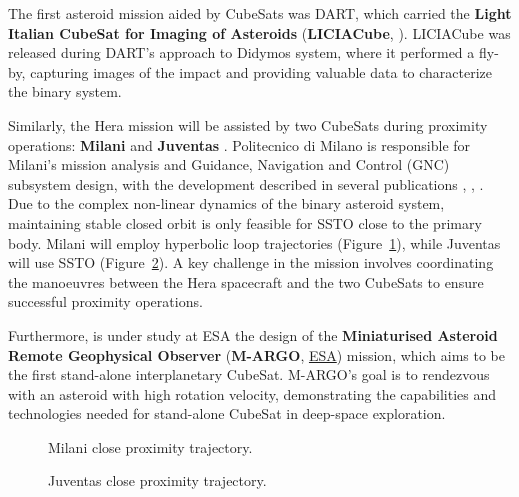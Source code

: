 \documentclass{Configuration_gigi/PoliMi3i_thesis}
\begin{document}
The first asteroid mission aided by CubeSats was DART, which carried the \textbf{Light Italian CubeSat for Imaging of Asteroids} (\textbf{LICIACube}, \cite{liciacube}). LICIACube was released during DART's approach to Didymos system, where it performed a fly-by, capturing images of the impact and providing valuable data to characterize the binary system. 

Similarly, the Hera mission will be assisted by two CubeSats during proximity operations: \textbf{Milani} and \textbf{Juventas} \cite{heracube}. Politecnico di Milano is responsible for Milani's mission analysis and Guidance, Navigation and Control (GNC) subsystem design, with the development described in several publications \cite{milani1}, \cite{milani2}, \cite{milani3}. Due to the complex non-linear dynamics of the binary asteroid system, maintaining stable closed orbit is only feasible for SSTO close to the primary body. Milani will employ hyperbolic loop trajectories (Figure~\ref{fig:milaniCPO}), while Juventas will use SSTO (Figure~\ref{fig:juventasCPO}). A key challenge in the mission involves coordinating the manoeuvres between the Hera spacecraft and the two CubeSats to ensure successful proximity operations. 

Furthermore, is under study at ESA the design of the \textbf{Miniaturised Asteroid Remote Geophysical Observer} (\textbf{M-ARGO}, \href{https://www.esa.int/Enabling_Support/Space_Engineering_Technology/Shaping_the_Future/M-Argo_Journey_of_a_suitcase-sized_asteroid_explorer}{ESA}) mission, which aims to be the first stand-alone interplanetary CubeSat. M-ARGO's goal is to rendezvous with an asteroid with high rotation velocity, demonstrating the capabilities and technologies needed for stand-alone CubeSat in deep-space exploration.

\begin{figure}[H]
    \centering
    \quad
    \caption[Milani proximity operations.]{Milani close proximity trajectory.}
    \label{fig:milaniCPO}
\end{figure}

\begin{figure}[H]
    \centering
    \quad
    \caption[Juventas proximity operations.]{Juventas close proximity trajectory.}
    \label{fig:juventasCPO}
\end{figure}
\end{document}
